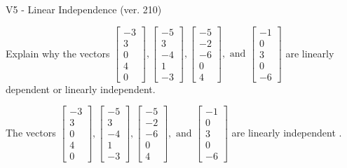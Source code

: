 \begin{exercise}
  \begin{exerciseTitle}V5 - Linear Independence (ver. 210)\end{exerciseTitle}
  \begin{exerciseStatement}
    Explain why the vectors \(\left[\begin{array}{r}
-3 \\
3 \\
0 \\
4 \\
0
\end{array}\right] , \left[\begin{array}{r}
-5 \\
3 \\
-4 \\
1 \\
-3
\end{array}\right] , \left[\begin{array}{r}
-5 \\
-2 \\
-6 \\
0 \\
4
\end{array}\right] , \text{ and } \left[\begin{array}{r}
-1 \\
0 \\
3 \\
0 \\
-6
\end{array}\right]\) are linearly dependent or linearly independent.	


  \end{exerciseStatement}
  \begin{exerciseAnswer}
   The vectors \(\left[\begin{array}{r}
-3 \\
3 \\
0 \\
4 \\
0
\end{array}\right] , \left[\begin{array}{r}
-5 \\
3 \\
-4 \\
1 \\
-3
\end{array}\right] , \left[\begin{array}{r}
-5 \\
-2 \\
-6 \\
0 \\
4
\end{array}\right] , \text{ and } \left[\begin{array}{r}
-1 \\
0 \\
3 \\
0 \\
-6
\end{array}\right]\) are 
  	 linearly independent  .
  


  \end{exerciseAnswer}
\end{exercise}